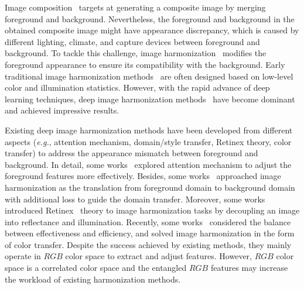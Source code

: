 \documentclass[sigconf]{acmart}
\begin{document}
Image composition~\cite{niu2021making} targets at generating a composite image by merging foreground and background. Nevertheless, the foreground and background in the obtained composite image might have appearance discrepancy, which is caused by different lighting, climate, and capture devices between foreground and background. To tackle this challenge, image harmonization~\cite{sunkavalli2010multi, xue2012understanding, dovenet, issam, CDTNet} modifies the foreground appearance to ensure its compatibility with the background.
Early traditional image harmonization methods~\cite{sunkavalli2010multi, xue2012understanding, song2020illumination, lalonde2007using} are often designed based on low-level color and illumination statistics. However, with the rapid advance of deep learning techniques, deep image harmonization methods~\cite{dovenet, issam, CDTNet, harmonizer} have become dominant and achieved impressive results.

Existing deep image harmonization methods have been developed from different aspects (\emph{e.g.}, attention mechanism, domain/style transfer, Retinex theory, color transfer) to address the appearance mismatch between foreground and background.
In detail, some works~\cite{ssam, feature_mod} explored attention mechanism to adjust the foreground features more effectively. 
Besides, some works~\cite{dovenet, bargainnet} approached image harmonization as the translation from foreground domain to background domain with additional loss to guide the domain transfer.
Moreover, some works~\cite{intrinsic, IHT} introduced Retinex~\cite{land1971lightness} theory to image harmonization tasks by decoupling an image into reflectance and illumination. 
Recently, some works~\cite{harmonizer, CDTNet} considered the balance between effectiveness and efficiency, and solved image harmonization in the form of color transfer.
Despite the success achieved by existing methods, they mainly operate in $RGB$ color space to extract and adjust features.
However,  $RGB$ color space is a correlated color space and the entangled $RGB$ features may increase the workload of existing harmonization methods.
\end{document}
